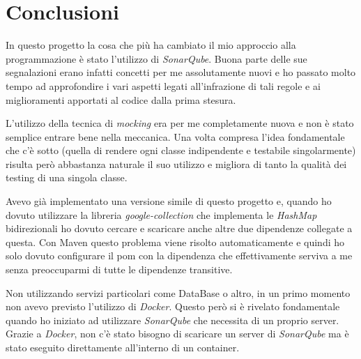 \chapter{Conclusioni}
	In questo progetto la cosa che più ha cambiato il mio approccio alla programmazione è stato l'utilizzo di \emph{SonarQube}. Buona parte delle sue segnalazioni erano infatti concetti per me assolutamente nuovi e ho passato molto tempo ad approfondire i vari aspetti legati all'infrazione di tali regole e ai miglioramenti apportati al codice dalla prima stesura.
	
	L'utilizzo della tecnica di \emph{mocking} era per me completamente nuova e non è stato semplice entrare bene nella meccanica. Una volta compresa l'idea fondamentale che c'è sotto (quella di rendere ogni classe indipendente e testabile singolarmente) risulta però abbastanza naturale il suo utilizzo e migliora di tanto la qualità dei testing di una singola classe.
	
	Avevo già implementato una versione simile di questo progetto e, quando ho dovuto utilizzare la libreria \emph{google-collection} che implementa le \emph{HashMap} bidirezionali ho dovuto cercare e scaricare anche altre due dipendenze collegate a questa. Con Maven questo problema viene risolto automaticamente e quindi ho solo dovuto configurare il pom con la dipendenza che effettivamente serviva a me senza preoccuparmi di tutte le dipendenze transitive.
	
	Non utilizzando servizi particolari come DataBase o altro, in un primo momento non avevo previsto l'utilizzo di \emph{Docker}. Questo però si è rivelato fondamentale quando ho iniziato ad utilizzare \emph{SonarQube} che necessita di un proprio server. Grazie a \emph{Docker}, non c'è stato bisogno di scaricare un server di \emph{SonarQube} ma è stato eseguito direttamente all'interno di un container. 